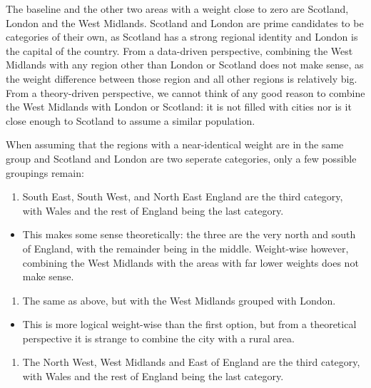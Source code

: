 \documentclass[]{article}
\providecommand{\tightlist}{%
  \setlength{\itemsep}{0pt}\setlength{\parskip}{0pt}}
\begin{document}
The baseline and the other two areas with a weight close to zero are
Scotland, London and the West Midlands. Scotland and London are prime
candidates to be categories of their own, as Scotland has a strong
regional identity and London is the capital of the country. From a
data-driven perspective, combining the West Midlands with any region
other than London or Scotland does not make sense, as the weight
difference between those region and all other regions is relatively big.
From a theory-driven perspective, we cannot think of any good reason to
combine the West Midlands with London or Scotland: it is not filled with
cities nor is it close enough to Scotland to assume a similar
population.

When assuming that the regions with a near-identical weight are in the
same group and Scotland and London are two seperate categories, only a
few possible groupings remain:

\begin{enumerate}
\def\labelenumi{\arabic{enumi}.}
\tightlist
\item
  South East, South West, and North East England are the third category,
  with Wales and the rest of England being the last category.
\end{enumerate}

\begin{itemize}
\tightlist
\item
  This makes some sense theoretically: the three are the very north and
  south of England, with the remainder being in the middle. Weight-wise
  however, combining the West Midlands with the areas with far lower
  weights does not make sense.
\end{itemize}

\begin{enumerate}
\def\labelenumi{\arabic{enumi}.}
\setcounter{enumi}{1}
\tightlist
\item
  The same as above, but with the West Midlands grouped with London.
\end{enumerate}

\begin{itemize}
\tightlist
\item
  This is more logical weight-wise than the first option, but from a
  theoretical perspective it is strange to combine the city with a rural
  area.
\end{itemize}

\begin{enumerate}
\def\labelenumi{\arabic{enumi}.}
\setcounter{enumi}{2}
\tightlist
\item
  The North West, West Midlands and East of England are the third
  category, with Wales and the rest of England being the last category.
\end{enumerate}
\end{document}

